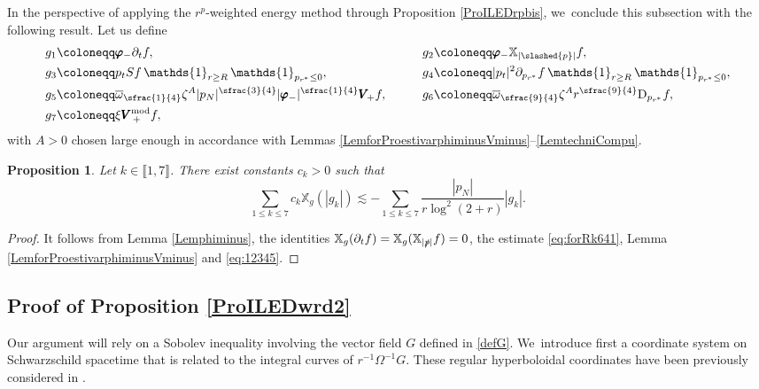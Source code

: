 \documentclass[10pt]{amsart}
\theoremstyle{plain}
\newtheorem{proposition}{Proposition}[section]
\theoremstyle{definition}
\newcommand\z{{\zeta}}
\newcommand\T{{\mathbb{X}}}
\begin{document}
In the perspective of applying the $r^p$-weighted energy method through Proposition \ref{ProILEDrpbis}, we~conclude this subsection with the following result. Let us define
\begin{alignat*}{2}
&g_1 \coloneqq \pmb{\varphi}_- \partial_t f, \qquad
&&g_2 \coloneqq \pmb{\varphi}_- \T_{|\slashed{p}|} f, \\
&g_3 \coloneqq p_t Sf \, \mathds{1}_{r \geq R} \, \mathds{1}_{p_{r^*} \leq 0}, \qquad
&& g_4 \coloneqq |p_t|^2 \partial_{p_{r^*}} f \, \mathds{1}_{r \geq R} \, \mathds{1}_{p_{r^*} \leq 0}, \\
&g_5 \coloneqq \overline{\omega}_{\sfrac{1}{4}} \z^A |p_N|^{\sfrac{3}{4}} |\pmb{\varphi}_-|^{\sfrac{1}{4}} \pmb{V}_{\! +} f, \qquad && g_6 \coloneqq \overline{\omega}_{\sfrac{9}{4}} \z^A r^{\sfrac{9}{4}} \mathrm{D}_{p_{r^*}} f, \\
&g_7 \coloneqq \xi \pmb{V}_{\, +}^{ \mathrm{mod}} f,
\end{alignat*}
with $A>0$ chosen large enough in accordance with Lemmas \ref{LemforProestivarphiminusVminus}--\ref{LemtechniCompu}.

\begin{proposition}\label{Rksystemderiv}
Let $k\in \llbracket 1, 7 \rrbracket$. There exist constants $c_k>0$ such that
\begin{equation}
\sum_{1 \leq k \leq 7} c_k \T_g (|g_k|) \lesssim -\sum_{1 \leq k \leq 7} \frac{|p_N|}{r\log^2(2+r)} |g_k|.
\end{equation}
\end{proposition}

\begin{proof}
It follows from Lemma \ref{Lemphiminus}, the identities $\T_g(\partial_t f)=\T_g(\T_{|\slashed{p}|}f)=0$, the estimate \eqref{eq:forRk641}, Lemma \ref{LemforProestivarphiminusVminus} and \eqref{eq:12345}.
\end{proof}

\subsection{Proof of Proposition \ref{ProILEDwrd2}}\label{Subsec75}

Our argument will rely on a Sobolev inequality involving the vector field $G$ defined in \eqref{defG}. We~introduce first a coordinate system on Schwarzschild spacetime that is related to the integral curves of $r^{-1} \Omega^{-1}G$. These regular hyperboloidal coordinates have been previously considered in \cite{Mavr23}.
\end{document}
